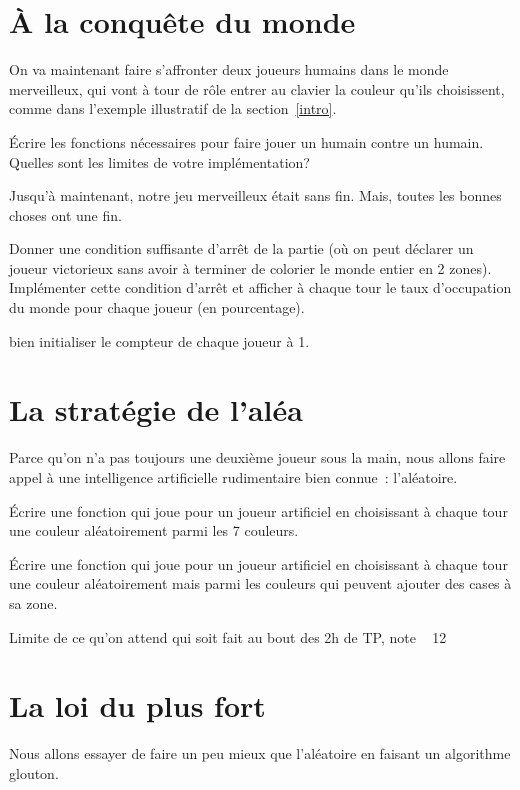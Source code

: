 \documentclass[a4paper,10pt]{article}
\begin{document}
\section{\`A la conquête du monde}

On va maintenant faire s'affronter deux joueurs humains dans le monde merveilleux, qui vont à tour de rôle entrer au clavier la couleur qu'ils choisissent, comme dans l'exemple illustratif de la section~\ref{intro}.

\Question \'Ecrire les fonctions nécessaires pour faire jouer un humain contre un humain. Quelles sont les limites de 
votre implémentation?

\bigskip
Jusqu'à maintenant, notre jeu merveilleux était sans fin. Mais, toutes
les bonnes choses ont une fin.

\Question Donner une condition suffisante d'arrêt de la partie (où on peut déclarer un joueur victorieux sans avoir à 
terminer de colorier le monde entier en 2 zones). Implémenter cette condition d'arrêt et afficher à chaque tour le taux 
d'occupation du monde pour chaque joueur (en pourcentage). 

\begin{Reponse}
bien initialiser le compteur de chaque joueur à 1.
\end{Reponse}


\section{La stratégie de l'aléa}
Parce qu'on n'a pas toujours une deuxième joueur sous la main, nous allons faire appel à une intelligence artificielle rudimentaire bien connue~: l'aléatoire.

\Question \'Ecrire une fonction qui joue pour un joueur artificiel en
  choisissant à chaque tour une couleur aléatoirement parmi les 7
  couleurs.

\Question   \'Ecrire une fonction qui joue pour un joueur artificiel en
  choisissant à chaque tour une couleur aléatoirement mais parmi les
  couleurs qui peuvent ajouter des cases à sa zone.


\begin{Reponse}
Limite de ce qu'on attend qui soit fait au bout des 2h de TP, note ~ 12
\end{Reponse}



\section{La loi du plus fort}
Nous allons essayer de faire un peu mieux que l'aléatoire en faisant un algorithme glouton.
\end{document}
